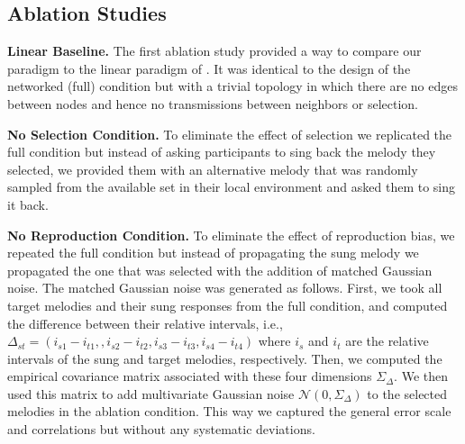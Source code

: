 \documentclass[10pt,letterpaper]{article}
\begin{document}
\subsection{Ablation Studies}
\noindent\textbf{Linear Baseline.} The first ablation study provided a way to compare our paradigm to the linear paradigm of . It was identical to the design of the networked (full) condition but with a trivial topology in which there are no edges between nodes and hence no transmissions between neighbors or selection.   

\noindent\textbf{No Selection Condition.} To eliminate the effect of selection we replicated the full condition but instead of asking participants to sing back the melody they selected, we provided them with an alternative melody that was randomly sampled from the available set in their local environment and asked them to sing it back.

\noindent\textbf{No Reproduction Condition.} To eliminate the effect of reproduction bias, we repeated the full condition but instead of propagating the sung melody we propagated the one that was selected with the addition of matched Gaussian noise. The matched Gaussian noise was generated as follows. First, we took all target melodies and their sung responses from the full condition, and computed the difference between their relative intervals, i.e., $\Delta_{st}=(i_{s1}-i_{t1},,i_{s2}-i_{t2},i_{s3}-i_{t3},i_{s4}-i_{t4})$ where $i_s$ and $i_t$ are the relative intervals of the sung and target melodies, respectively. Then, we computed the empirical covariance matrix associated with these four dimensions $\Sigma_\Delta$. We then used this matrix to add multivariate Gaussian noise $\mathcal{N}(0,\Sigma_\Delta)$ to the selected melodies in the ablation condition. This way we captured the general error scale and correlations but without any systematic deviations. 
\end{document}
